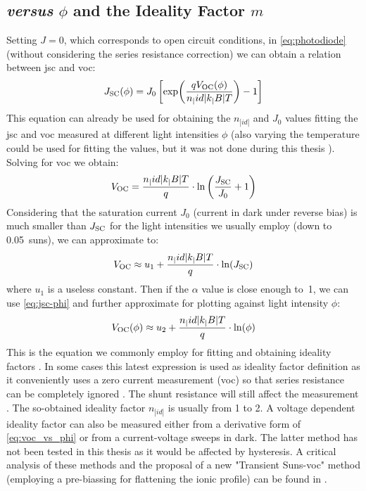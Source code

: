 	\subsection{ \textit{versus} $\phi$ and the Ideality Factor $m$}
		Setting $J=0$, which corresponds to open circuit conditions, in \cref{eq:photodiode} (without considering the series resistance correction) we can obtain a relation between \gls{jsc} and \gls{voc}:
		$$J_\mathrm{SC}(\phi) = J_0\left[\exp(\frac{qV_\mathrm{OC} (\phi)}{n_|id|k_|B|T})-1\right]$$
		This equation can already be used for obtaining the $n_|id|$ and $J_0$ values fitting the \gls{jsc} and \gls{voc} measured at different light intensities $\phi$ (also varying the temperature could be used for fitting the values, but it was not done during this thesis \cite{Tvingstedt2016}).
		Solving for \gls{voc} we obtain:
		$$V_\mathrm{OC} = \frac{n_|id|k_|B|T}{q}\cdot\ln\left(\frac{J_\mathrm{SC}}{J_0} + 1\right)$$
		Considering that the saturation current $J_0$ (current in dark under reverse bias) is much smaller than $J_\mathrm{SC}$ for the light intensities we usually employ (down to \SI{0.05}{suns}), we can approximate to:
		$$V_\mathrm{OC} \approx u_1 + \frac{n_|id|k_|B|T}{q}\cdot\ln(J_\mathrm{SC})$$
		where $u_1$ is a useless constant.
		Then if the $\alpha$ value is close enough to~1, we can use \cref{eq:jsc-phi} and further approximate for plotting against light intensity $\phi$:
		\begin{equation}\label{eq:voc_vs_phi}
			V_\mathrm{OC} (\phi) \approx u_2 + \frac{n_|id|k_|B|T}{q}\cdot\ln(\phi)
		\end{equation}
		This is the equation we commonly employ for fitting and obtaining ideality factors \cite{Nelson2003}.
		In some cases this latest expression is used as ideality factor definition as it conveniently uses a zero current measurement (\gls{voc}) so that series resistance can be completely ignored \cite{Kirchartz2012}.
		The shunt resistance will still affect the measurement \cite{Tvingstedt2017}.
		The so-obtained ideality factor $n_|id|$ is usually from 1 to 2.
		A voltage dependent ideality factor can also be measured either from a derivative form of \cref{eq:voc_vs_phi} \cite{Tvingstedt2017} or from a current-voltage sweeps in dark.
		The latter method has not been tested in this thesis as it would be affected by hysteresis.
		A critical analysis of these methods and the proposal of a new "Transient Suns-\gls{voc}" method (employing a pre-biassing for flattening the ionic profile) can be found in .

